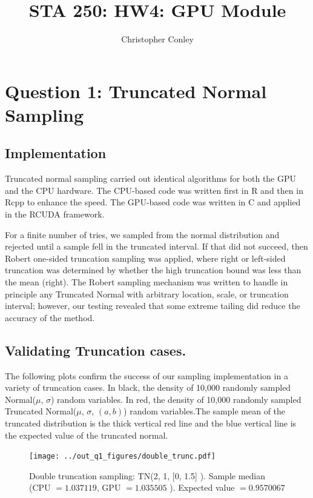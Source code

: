 \documentclass[11pt]{amsart}
\title{STA 250: HW4: GPU Module}
\author{Christopher Conley}
\date{}                                           %
\begin{document}
\maketitle
\tableofcontents
\doublespacing

\section{Question 1:  Truncated Normal Sampling}


\subsection{Implementation}

Truncated normal sampling carried out identical algorithms for both the GPU and the CPU hardware. The CPU-based code was written first in R and then in Rcpp to enhance the speed. The GPU-based code was written in C and applied in the RCUDA framework. 

 For a finite number of tries, we sampled from the normal distribution and rejected until a sample fell in the truncated interval. If that  did not succeed, then Robert one-sided truncation sampling was applied, where right or left-sided truncation was determined by whether the high truncation bound was less than the mean (right). The Robert sampling mechanism was written to handle in principle any Truncated Normal with arbitrary location, scale, or truncation interval; however, our testing revealed that some extreme tailing did reduce the accuracy of the method. \\ 

\subsection{Validating Truncation cases.}

The following plots confirm the success of our sampling implementation in a variety of truncation cases. In black, the density of 10,000 randomly sampled Normal($\mu$, $\sigma$) random variables. In red, the density of 10,000 randomly sampled Truncated Normal($\mu$, $\sigma$, $(a , b)$) random variables.The sample mean of the truncated distribution is the thick vertical red line and the blue vertical line is the expected value of the truncated normal.

\begin{figure}[htbp] %
   \centering
   \texttt{[image: ../out\_q1\_figures/double\_trunc.pdf]} 
   \caption{Double truncation sampling:  TN\Big (2, 1, [0, 1.5] \Big ). Sample median (CPU $= 1.037119$, GPU $=1.035505 $ ). Expected value $= 0.9570067$} 
   \label{fig:dtrunc}
\end{figure}
\end{document}
